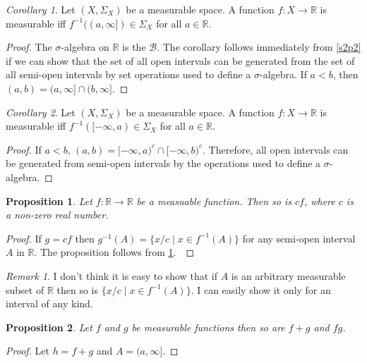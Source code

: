 \documentclass{article}
\newcommand{\sor}{\mathbb{R}}
\theoremstyle{plain}
\numberwithin{thm}{section}
\theoremstyle{plain}
\newtheorem{prop}{Proposition}
\numberwithin{prop}{section}
\theoremstyle{definition}
\numberwithin{defn}{section}
\theoremstyle{remark}
\newtheorem*{rem}{Remark}
\newtheorem{cor}{Corollary}
\numberwithin{equation}{section}
\begin{document}
\begin{cor}\label{s2c2}
Let $(X, \Sigma_X)$ be a measurable space. A function $f: X \rightarrow \sor$
is measurable iff $f^{-1}((a, \infty]) \in \Sigma_X$ for all $a \in \sor$.
\end{cor}
\begin{proof}
The $\sigma$-algebra on $\sor$ is the $\mathcal{B}$. The corollary follows
immediately from \ref{s2p2} if we can show that the set of all open intervals
can be generated from the set of all semi-open intervals by set operations used
to define a $\sigma$-algebra. If $a < b$, then $(a, b) = (a, \infty] \cap (b,
\infty]$.
\end{proof}

\begin{cor}\label{s2c3}
Let $(X, \Sigma_X)$ be a measurable space. A function $f: X \rightarrow \sor$
is measurable iff $f^{-1}([-\infty, a) \in \Sigma_X$ for all $a \in \sor$.
\end{cor}
\begin{proof}
If $a < b$, $(a, b) = [-\infty, a)^c \cap [-\infty, b)^c$. Therefore, all open
intervals can be generated from semi-open intervals by the operations used to
define a $\sigma$-algebra.
\end{proof}

\begin{prop}\label{s2p3}
Let $f: \sor \rightarrow \sor$ be a measuable function. Then so is $cf$, where $c$
is a non-zero real number.
\end{prop}
\begin{proof}
If $g = cf$ then $g^{-1}(A) = \{x/c \;|\; x \in f^{-1}(A)\}$ for any semi-open 
interval $A$ in $\mathbb{R}$. The proposition follows from \ref{s2c2}.\
\end{proof}

\begin{rem}
I don't think it is easy to show that if $A$ is an arbitrary measurable subset 
of $\sor$ then so is $\{x/c \;|\; x \in f^{-1}(A)\}$. I can easily show it only 
for an interval of any kind.
\end{rem}

\begin{prop}\label{s2p3}
Let $f$ and $g$ be measurable functions then so are $f + g$ and $fg$.
\end{prop}
\begin{proof}
Let $h = f + g$ and $A = (a, \infty]$.
\end{proof}
\end{document}
